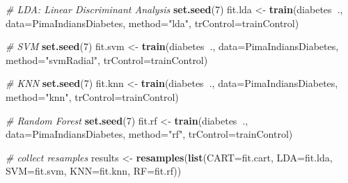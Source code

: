 \documentclass[]{book}
\newenvironment{Shaded}{\begin{snugshade}}{\end{snugshade}}
\newcommand{\CommentTok}[1]{\textcolor[rgb]{0.56,0.35,0.01}{\textit{#1}}}
\newcommand{\DataTypeTok}[1]{\textcolor[rgb]{0.13,0.29,0.53}{#1}}
\newcommand{\DecValTok}[1]{\textcolor[rgb]{0.00,0.00,0.81}{#1}}
\newcommand{\KeywordTok}[1]{\textcolor[rgb]{0.13,0.29,0.53}{\textbf{#1}}}
\newcommand{\NormalTok}[1]{#1}
\newcommand{\OperatorTok}[1]{\textcolor[rgb]{0.81,0.36,0.00}{\textbf{#1}}}
\newcommand{\StringTok}[1]{\textcolor[rgb]{0.31,0.60,0.02}{#1}}
\begin{document}
\begin{Shaded}
\begin{Highlighting}[]
\CommentTok{# LDA: Linear Discriminant Analysis}
\KeywordTok{set.seed}\NormalTok{(}\DecValTok{7}\NormalTok{)}
\NormalTok{fit.lda <-}\StringTok{ }\KeywordTok{train}\NormalTok{(diabetes}\OperatorTok{~}\NormalTok{., }\DataTypeTok{data=}\NormalTok{PimaIndiansDiabetes, }
                 \DataTypeTok{method=}\StringTok{"lda"}\NormalTok{, }\DataTypeTok{trControl=}\NormalTok{trainControl)}
\end{Highlighting}
\end{Shaded}

\begin{Shaded}
\begin{Highlighting}[]
\CommentTok{# SVM}
\KeywordTok{set.seed}\NormalTok{(}\DecValTok{7}\NormalTok{)}
\NormalTok{fit.svm <-}\StringTok{ }\KeywordTok{train}\NormalTok{(diabetes}\OperatorTok{~}\NormalTok{., }\DataTypeTok{data=}\NormalTok{PimaIndiansDiabetes, }
                 \DataTypeTok{method=}\StringTok{"svmRadial"}\NormalTok{, }\DataTypeTok{trControl=}\NormalTok{trainControl)}
\end{Highlighting}
\end{Shaded}

\begin{Shaded}
\begin{Highlighting}[]
\CommentTok{# KNN}
\KeywordTok{set.seed}\NormalTok{(}\DecValTok{7}\NormalTok{)}
\NormalTok{fit.knn <-}\StringTok{ }\KeywordTok{train}\NormalTok{(diabetes}\OperatorTok{~}\NormalTok{., }\DataTypeTok{data=}\NormalTok{PimaIndiansDiabetes, }
                 \DataTypeTok{method=}\StringTok{"knn"}\NormalTok{, }\DataTypeTok{trControl=}\NormalTok{trainControl)}
\end{Highlighting}
\end{Shaded}

\begin{Shaded}
\begin{Highlighting}[]
\CommentTok{# Random Forest}
\KeywordTok{set.seed}\NormalTok{(}\DecValTok{7}\NormalTok{)}
\NormalTok{fit.rf <-}\StringTok{ }\KeywordTok{train}\NormalTok{(diabetes}\OperatorTok{~}\NormalTok{., }\DataTypeTok{data=}\NormalTok{PimaIndiansDiabetes, }
                \DataTypeTok{method=}\StringTok{"rf"}\NormalTok{, }\DataTypeTok{trControl=}\NormalTok{trainControl)}
\end{Highlighting}
\end{Shaded}

\begin{Shaded}
\begin{Highlighting}[]
\CommentTok{# collect resamples}
\NormalTok{results <-}\StringTok{ }\KeywordTok{resamples}\NormalTok{(}\KeywordTok{list}\NormalTok{(}\DataTypeTok{CART=}\NormalTok{fit.cart, }
                          \DataTypeTok{LDA=}\NormalTok{fit.lda, }
                          \DataTypeTok{SVM=}\NormalTok{fit.svm, }
                          \DataTypeTok{KNN=}\NormalTok{fit.knn, }
                          \DataTypeTok{RF=}\NormalTok{fit.rf))}
\end{Highlighting}
\end{Shaded}
\end{document}
